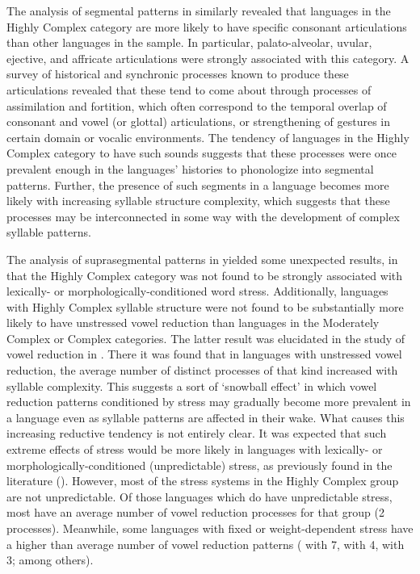   The analysis of segmental patterns in  similarly revealed that languages in the Highly Complex category are more likely to have specific consonant articulations than other languages in the sample. In particular, palato-alveolar, uvular, ejective, and affricate articulations were strongly associated with this category. A survey of historical and synchronic processes known to produce these articulations revealed that these tend to come about through processes of assimilation and fortition, which often correspond to the temporal overlap of consonant and vowel (or glottal) articulations, or strengthening of gestures in certain domain or vocalic environments. The tendency of languages in the Highly Complex category to have such sounds suggests that these processes were once prevalent enough in the languages’ histories to phonologize into segmental patterns. Further, the presence of such segments in a language becomes more likely with increasing syllable structure complexity, which suggests that these processes may be interconnected in some way with the development of complex syllable patterns.

  The analysis of suprasegmental patterns in  yielded some unexpected results, in that the Highly Complex category was not found to be strongly associated with lexically- or morphologically-conditioned word stress. Additionally, languages with Highly Complex syllable structure were not found to be substantially more likely to have unstressed vowel reduction than languages in the Moderately Complex or Complex categories. The latter result was elucidated in the study of vowel reduction in . There it was found that in languages with unstressed vowel reduction, the average number of distinct processes of that kind increased with syllable complexity. This suggests a sort of ‘snowball effect’ in which vowel reduction patterns conditioned by stress may gradually become more prevalent in a language even as syllable patterns are affected in their wake. What causes this increasing reductive tendency is not entirely clear. It was expected that such extreme effects of stress would be more likely in languages with lexically- or morphologically-conditioned (unpredictable) stress, as previously found in the literature (\citealt{BybeeEtAl1998,Schiering2007}). However, most of the stress systems in the Highly Complex group are not unpredictable. Of those languages which do have unpredictable stress, most have an average number of vowel reduction processes for that group (2 processes). Meanwhile, some languages with fixed or weight-dependent stress have a higher than average number of vowel reduction patterns ( with 7,  with 4,  with 3; among others). 

